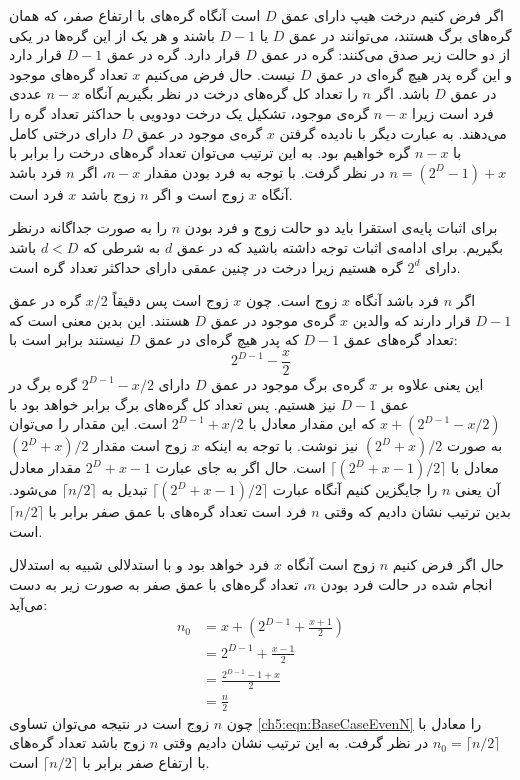 اگر فرض کنیم درخت هیپ دارای عمق {$D$} است آنگاه گره‌های با ارتفاع صفر، که همان گره‌های برگ هستند، می‌توانند در عمق {$D$} یا {$D-1$} باشند و هر یک از این گره‌ها در یکی از دو حالت زیر صدق می‌کنند:
 گره‌‌ در عمق {$D$} قرار دارد.
 گره‌ در عمق {$D-1$} قرار دارد و این گره پدر هیچ گره‌ای در عمق {$D$} نیست.
حال فرض می‌کنیم {$x$}  تعداد گره‌های موجود در عمق {$D$} باشد. اگر {$n$} را تعداد کل گره‌های درخت در نظر بگیریم آنگاه {$n-x$} عددی فرد است زیرا {$n-x$} گره‌ی موجود، تشکیل یک درخت دودویی با حداکثر تعداد گره را می‌دهند. به عبارت دیگر با نادیده گرفتن {$x$} گره‌ی موجود در عمق {$D$} دارای درختی کامل با {$n-x$} گره خواهیم بود. به این ترتیب می‌توان تعداد گره‌ها‌ی درخت را برابر با {$n=(2^{D}-1)+x$} در نظر گرفت. با توجه به فرد بودن مقدار {$n-x$}، اگر {$n$} فرد باشد آنگاه {$x$} زوج است و اگر {$n$} زوج باشد {$x$} فرد است.

برای اثبات پایه‌ی استقرا باید دو حالت زوج و فرد بودن {$n$} را به صورت جداگانه درنظر بگیریم. برای ادامه‌ی اثبات توجه داشته باشید که در عمق {$d$} به شرطی که {$d<D$} باشد دارای {$2^d$} گره هستیم زیرا درخت در چنین عمقی دارای حداکثر تعداد گره است.

اگر {$n$} فرد باشد آنگاه {$x$} زوج است. چون {$x$} زوج است پس دقیقاً {$x/2$} گره در عمق {$D-1$} قرار دارند که والدین {$x$} گره‌ی موجود در عمق {$D$} هستند. این بدین معنی است که تعداد گره‌های عمق {$D-1$} که پدر هیچ گره‌ای در عمق {$D$} نیستند برابر است با:
\begin{equation}
2^{D-1}-\frac{x}{2}
\end{equation}
این یعنی علاوه بر {$x$} گره‌ی برگ موجود در عمق {$D$} دارای {$2^{D-1}-x/2$} گره برگ در عمق {$D-1$} نیز هستیم. پس تعداد کل گره‌های برگ برابر خواهد بود با {$x+(2^{D-1}-x/2)$} که این مقدار معادل با {$2^{D-1}+x/2$} است. این مقدار را می‌توان به صورت {$(2^D+x)/2$} نیز نوشت. با توجه به اینکه {$x$} زوج است مقدار {$(2^D+x)/2$} معادل با {$\lceil (2^D+x-1)/2\rceil$} است. حال اگر به جای عبارت {$2^D+x-1$} مقدار معادل آن یعنی {$n$} را جایگزین کنیم آنگاه عبارت {$\lceil (2^D+x-1)/2\rceil$} تبدیل به {$\lceil n/2\rceil$} می‌شود. بدین ترتیب نشان دادیم که وقتی {$n$} فرد است تعداد گره‌های با عمق صفر برابر با {$\lceil n/2\rceil$} است.

حال اگر فرض کنیم {$n$} زوج است آنگاه {$x$} فرد خواهد بود و با استدلالی شبیه به استدلال انجام شده در حالت فرد بودن {$n$}، تعداد گره‌های با عمق صفر به صورت زیر به دست می‌آید:
\begin{align}
n_0 &= x+\left( 2^{D-1} + \frac{x+1}{2}\right)\nonumber\\
&=2^{D-1}+\frac{x-1}{2}\nonumber\\
&=\frac{2^{D-1}-1+x}{2}\nonumber\\
&=\frac{n}{2}\label{ch5:eqn:BaseCaseEvenN}
\end{align}
چون {$n$} زوج است در نتیجه می‌توان تساوی {\eqref{ch5:eqn:BaseCaseEvenN}} را معادل با {$n_0=\lceil n/2\rceil$} در نظر گرفت. به این ترتیب نشان دادیم وقتی {$n$} زوج باشد تعداد گره‌های با ارتفاع صفر برابر با {$\lceil n/2\rceil$} است.


